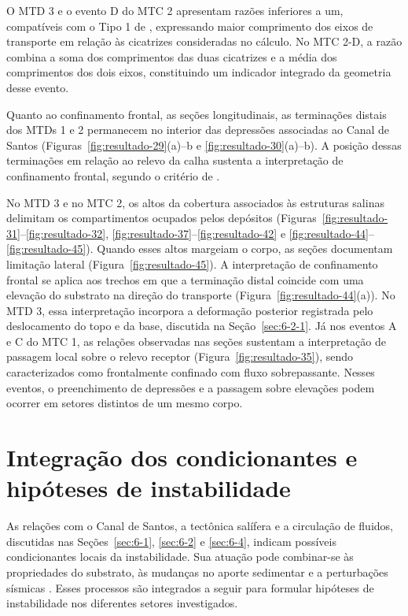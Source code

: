 O MTD 3 e o evento D do MTC 2 apresentam razões inferiores a um, compatíveis com o Tipo 1 de , expressando maior comprimento dos eixos de transporte em relação às cicatrizes consideradas no cálculo. No MTC 2-D, a razão combina a soma dos comprimentos das duas cicatrizes e a média dos comprimentos dos dois eixos, constituindo um indicador integrado da geometria desse evento.

Quanto ao confinamento frontal, as seções longitudinais, as terminações distais dos MTDs 1 e 2 permanecem no interior das depressões associadas ao Canal de Santos (Figuras~\ref{fig:resultado-29}(a)--b e \ref{fig:resultado-30}(a)--b). A posição dessas terminações em relação ao relevo da calha sustenta a interpretação de confinamento frontal, segundo o critério de .

No MTD 3 e no MTC 2, os altos da cobertura associados às estruturas salinas delimitam os compartimentos ocupados pelos depósitos (Figuras~\ref{fig:resultado-31}--\ref{fig:resultado-32}, \ref{fig:resultado-37}--\ref{fig:resultado-42} e \ref{fig:resultado-44}--\ref{fig:resultado-45}). Quando esses altos margeiam o corpo, as seções documentam limitação lateral (Figura~\ref{fig:resultado-45}). A interpretação de confinamento frontal se aplica aos trechos em que a terminação distal coincide com uma elevação do substrato na direção do transporte (Figura~\ref{fig:resultado-44}(a)). No MTD 3, essa interpretação incorpora a deformação posterior registrada pelo deslocamento do topo e da base, discutida na Seção~\ref{sec:6-2-1}. Já nos eventos A e C do MTC 1, as relações observadas nas seções sustentam a interpretação de passagem local sobre o relevo receptor (Figura~\ref{fig:resultado-35}), sendo caracterizados como frontalmente confinado com fluxo sobrepassante. Nesses eventos, o preenchimento de depressões e a passagem sobre elevações podem ocorrer em setores distintos de um mesmo corpo.

\section{Integração dos condicionantes e hipóteses de instabilidade}\label{sec:6-7}

As relações com o Canal de Santos, a tectônica salífera e a circulação de fluidos, discutidas nas Seções~\ref{sec:6-1}, \ref{sec:6-2} e \ref{sec:6-4}, indicam possíveis condicionantes locais da instabilidade. Sua atuação pode combinar-se às propriedades do substrato, às mudanças no aporte sedimentar e a perturbações sísmicas \cite{lee2007,scarselli2020}. Esses processos são integrados a seguir para formular hipóteses de instabilidade nos diferentes setores investigados.

